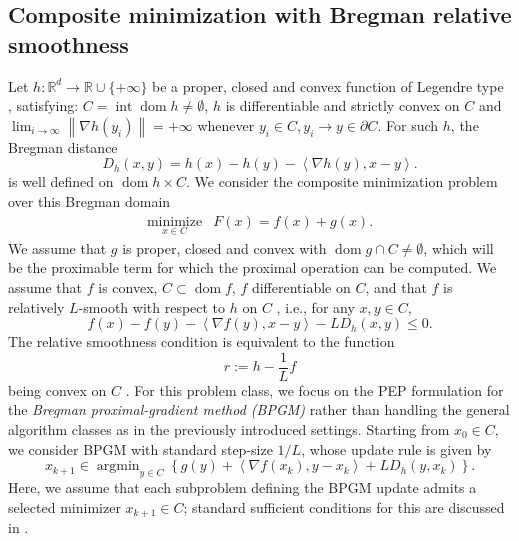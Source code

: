 \documentclass{article}
\theoremstyle{definition}
\theoremstyle{plain}
\DeclareMathOperator*{\argmin}{argmin}
\newcommand{\reals}{\mathbb{R}}
\newcommand{\inprod}[2]{\left\langle #1,#2 \right\rangle}
\newcommand{\norm}[1]{\left\|#1\right\|}
\newcommand{\bregsm}{f}
\newcommand{\bregprox}{g}
\newcommand{\bregaux}{r}
\begin{document}
\subsection{Composite minimization with Bregman relative smoothness}
\label{section:setting-composite-minimization-bregman}

Let $h:\reals^d\to\reals\cup\{+\infty\}$ be a proper, closed and convex function of Legendre type \cite[Section~26]{Rockafellar1970_convex}, satisfying: $C=\operatorname{int}\operatorname{dom}h\neq\emptyset$, $h$ is differentiable and strictly convex on $C$ and $\lim_{i\to \infty} \norm{\nabla h(y_i)} = +\infty$ whenever $y_i \in C, y_i \to y \in \partial C$.
For such $h$, the Bregman distance 
\[
    D_h(x,y) = h(x)-h(y)-\inprod{\nabla h(y)}{x-y}.
\]
is well defined on $\operatorname{dom}h\times C$.
We consider the composite minimization problem over this Bregman domain
\[
\begin{array}{cc}
    \underset{x\in C}{\text{minimize}} & F(x) = \bregsm(x)+\bregprox(x) .
\end{array}
\]
We assume that $\bregprox$ is proper, closed and convex with $\operatorname{dom}\bregprox\cap C \neq \emptyset$, which will be the proximable term for which the proximal operation can be computed.
We assume that $\bregsm$ is convex, $C\subset\operatorname{dom}\bregsm$, $\bregsm$ differentiable on $C$, and that $\bregsm$ is relatively $L$-smooth with respect to $h$ on $C$ \citep{BauschkeBolteTeboulle2017_descent,LuFreundNesterov2018_relatively}, i.e., for any $x,y \in C$,
\[
    \bregsm(x) - \bregsm(y) - \inprod{\nabla \bregsm(y)}{x-y} - L D_h(x,y) \le 0 .
\]
The relative smoothness condition is equivalent to the function
\[
    \bregaux:=h-\frac{1}{L}\bregsm
\]
being convex on $C$ \citep{LuFreundNesterov2018_relatively}.
For this problem class, we focus on the PEP formulation for the \textit{Bregman proximal-gradient method (BPGM)} rather than handling the general algorithm classes as in the previously introduced settings.
Starting from $x_0\in C$, we consider BPGM with standard step-size $1/L$, whose update rule is given by
\begin{equation*}
\tag{BPGM}
    x_{k+1}\in\argmin_{y\in C}
    \left\{
        \bregprox(y)+\inprod{\nabla \bregsm(x_k)}{y-x_k}
        +L D_h(y,x_k)
    \right\} .
\end{equation*}
Here, we assume that each subproblem defining the BPGM update admits a selected minimizer $x_{k+1}\in C$; standard sufficient conditions for this are discussed in \citep[Lemma~2]{BauschkeBolteTeboulle2017_descent}. 
\end{document}
